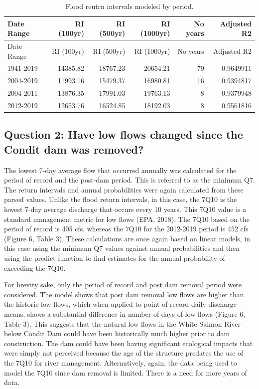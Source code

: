 \documentclass[
  12pt,
]{article}
\begin{document}
\begin{longtable}[]{@{}lrrrrr@{}}
\caption{Flood reutrn intervals modeled by period.}\tabularnewline
\toprule
Date Range & RI (100yr) & RI (500yr) & RI (1000yr) & No years & Adjusted
R2\tabularnewline
\midrule
\endfirsthead
\toprule
Date Range & RI (100yr) & RI (500yr) & RI (1000yr) & No years & Adjusted
R2\tabularnewline
\midrule
\endhead
1941-2019 & 14385.82 & 18767.23 & 20654.21 & 79 &
0.9649911\tabularnewline
2004-2019 & 11993.16 & 15479.37 & 16980.81 & 16 &
0.9394817\tabularnewline
2004-2011 & 13876.35 & 17991.03 & 19763.13 & 8 &
0.9379948\tabularnewline
2012-2019 & 12653.76 & 16524.85 & 18192.03 & 8 &
0.9561816\tabularnewline
\bottomrule
\end{longtable}

\hypertarget{question-2-have-low-flows-changed-since-the-condit-dam-was-removed}{%
\subsection{Question 2: Have low flows changed since the Condit dam was
removed?}\label{question-2-have-low-flows-changed-since-the-condit-dam-was-removed}}

The lowest 7-day average flow that occurred annually was calculated for
the period of record and the post-dam period. This is referred to as the
minimum Q7. The return intervals and annual probabilities were again
calculated from these parsed values. Unlike the flood return intervals,
in this case, the 7Q10 is the lowest 7-day average discharge that occurs
every 10 years. This 7Q10 value is a standard management metric for low
flows (EPA, 2018). The 7Q10 based on the period of record is 405 cfs,
whereas the 7Q10 for the 2012-2019 period is 452 cfs (Figure 6, Table
3). These calculations are once again based on linear models, in this
case using the minimum Q7 values against annual probabilities and then
using the predict function to find estimates for the annual probability
of exceeding the 7Q10.

For brevity sake, only the period of record and post dam removal period
were considered. The model shows that post dam removal low flows are
higher than the historic low flows, which when applied to point of
record daily discharge means, shows a substantial difference in number
of days of low flows (Figure 6, Table 3). This suggests that the natural
low flows in the White Salmon River below Condit Dam could have been
historically much higher prior to dam construction. The dam could have
been having significant ecological impacts that were simply not
perceived because the age of the structure predates the use of the 7Q10
for river management. Alternatively, again, the data being used to model
the 7Q10 since dam removal is limited. There is a need for more years of
data.
\end{document}
